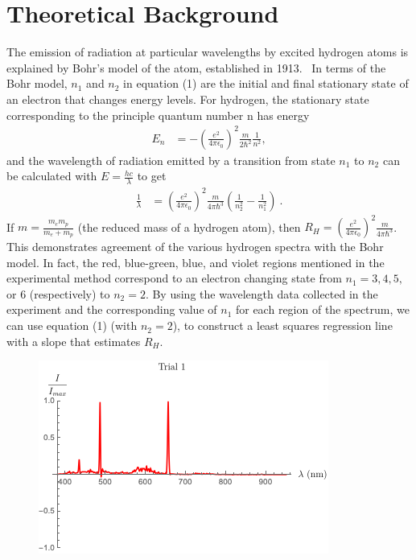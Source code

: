 \documentclass[aps,prl,preprint,groupedaddress]{revtex4-2}
\begin{document}
\section{Theoretical Background}
The emission of radiation at particular wavelengths by excited hydrogen atoms is explained by Bohr's model of the atom, established in 1913.~\cite{krane} In terms of the Bohr model, $n_1$ and $n_2$ in equation (1) are the initial and final stationary state of an electron that changes energy levels. For hydrogen, the stationary state corresponding to the principle quantum number n has energy 
\begin{align}
    E_n &= -(\frac{e^2}{4 \pi \epsilon_0})^2 \frac{m}{2\hbar^2} \frac{1}{n^2},
\end{align}
and the wavelength of radiation emitted by a transition from state $n_1$ to $n_2$  can be calculated with $E = \frac{hc}{\lambda}$ to get
\begin{align}
    \frac{1}{\lambda}&=(\frac{e^2}{4 \pi \epsilon_0})^{2}\frac{m}{4\pi\hbar^3}(\frac{1}{n_2^2}-\frac{1}{n_1^2})~.
\end{align}
If $m=\frac{m_e m_p}{m_e + m_p}$ (the reduced mass of a hydrogen atom), then $R_H = (\frac{e^2}{4 \pi \epsilon_0})^{2}\frac{m}{4\pi\hbar^3}$. This demonstrates agreement of the various hydrogen spectra with the Bohr model. In fact, the red, blue-green, blue, and violet regions mentioned in the experimental method correspond to an electron changing state from $n_1 = 3, 4, 5,$ or $6$ (respectively) to $n_2 = 2$. By using the wavelength data collected in the experiment and the corresponding value of $n_1$ for each region of the spectrum, we can use equation (1) (with $n_2=2$), to construct a least squares regression line with a slope that estimates $R_H$.

    \begin{figure}[h]
        \centering
		\includegraphics{res/trial1.png}
		\caption{}
    \end{figure}
    
\end{document}
